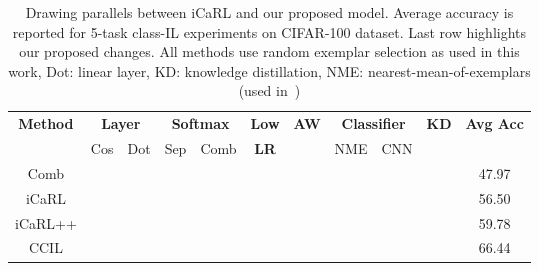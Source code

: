\documentclass[final]{cvpr}
\def\yo{\ensuremath\checkmark}
\def\byo{\pmb{\ensuremath\checkmark}}
\begin{document}
\begin{table*}[!t]
\begin{center}
 \begin{tabular}{|c || c | c || c | c || c || c || c | c  || c || c |} 
 \hline
\multirow{2}{*}{\textbf{Method}} & \multicolumn{2}{c||}{\textbf{Layer}} &  \multicolumn{2}{c||}{\textbf{Softmax}} & {\textbf{Low}} & \multirow{2}{*}{\textbf{AW}} &  \multicolumn{2}{c||}{\textbf{Classifier}}  & \multirow{2}{*}{\textbf{KD}} & \multirow{2}{*}{\textbf{Avg Acc}}\\
 & Cos & Dot & Sep &  Comb  & {\textbf{LR}} &   & NME &  CNN  &  & \\ [0.5ex] 
 \hline\hline
Comb         &        & \yo   &        &  \yo  &         &        &   &  \yo    &      &   47.97   \\
 \hline
iCaRL       &        & \yo   &        &  \yo  &         &        &  \yo  &    &  \yo  &   56.50   \\
\hline
iCaRL++  &  \yo   &       &        &  \yo  &         &  \yo        &  & \yo  &  \yo  &   59.78       \\
\hline
CCIL  &  \yo   &       & \cellcolor{blue!15}\byo    &       &  \cellcolor{blue!15}\byo    &  \yo   &  &  \yo  &  \yo  &   66.44    \\
\hline
\end{tabular}
\end{center}
\caption{Drawing parallels between iCaRL and our proposed model. Average accuracy is reported for 5-task class-IL experiments on CIFAR-100 dataset. Last row highlights our proposed changes. All methods use random exemplar selection as used in this work, Dot: linear layer, KD: knowledge distillation, NME: nearest-mean-of-exemplars (used in~\cite{icarl})}
\label{tab:icarl_vs_ccil}
\end{table*}
\end{document}
